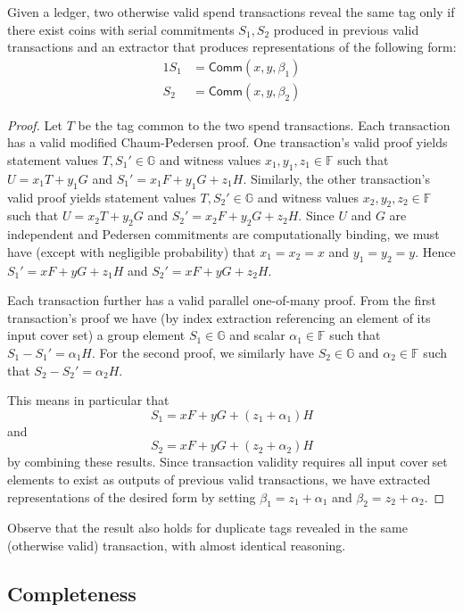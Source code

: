 \documentclass{llncs}
\newcommand{\G}{\mathbb{G}}
\newcommand{\F}{\mathbb{F}}
\newcommand{\func}[1]{\mathsf{#1}}
\newcommand{\comm}{\func{Comm}}
\begin{document}
\begin{lemma}\label{lem:extract}
    Given a ledger, two otherwise valid spend transactions reveal the same tag only if there exist coins with serial commitments $S_1,S_2$ produced in previous valid transactions and an extractor that produces representations of the following form:
    \begin{alignat*}{1}
        S_1 &= \comm(x,y,\beta_1) \\
        S_2 &= \comm(x,y,\beta_2)
    \end{alignat*}
\end{lemma}

\begin{proof}
    Let $T$ be the tag common to the two spend transactions.
    Each transaction has a valid modified Chaum-Pedersen proof.
    One transaction's valid proof yields statement values $T,S_1' \in \G$ and witness values $x_1,y_1,z_1 \in \F$ such that $U = x_1 T + y_1 G$ and $S_1' = x_1 F + y_1 G + z_1 H$.
    Similarly, the other transaction's valid proof yields statement values $T,S_2' \in \G$ and witness values $x_2,y_2,z_2 \in \F$ such that $U = x_2 T + y_2 G$ and $S_2' = x_2 F + y_2 G + z_2 H$.
    Since $U$ and $G$ are independent and Pedersen commitments are computationally binding, we must have (except with negligible probability) that $x_1 = x_2 = x$ and $y_1 = y_2 = y$.
    Hence $S_1' = xF + yG + z_1 H$ and $S_2' = xF + yG + z_2 H$.

    Each transaction further has a valid parallel one-of-many proof.
    From the first transaction's proof we have (by index extraction referencing an element of its input cover set) a group element $S_1 \in \G$ and scalar $\alpha_1 \in \F$ such that $S_1 - S_1' = \alpha_1 H$.
    For the second proof, we similarly have $S_2 \in \G$ and $\alpha_2 \in \F$ such that $S_2 - S_2' = \alpha_2 H$.

    This means in particular that $$S_1 = xF + yG + (z_1 + \alpha_1)H$$ and $$S_2 = xF + yG + (z_2 + \alpha_2)H$$ by combining these results.
    Since transaction validity requires all input cover set elements to exist as outputs of previous valid transactions, we have extracted representations of the desired form by setting $\beta_1 = z_1 + \alpha_1$ and $\beta_2 = z_2 + \alpha_2$.
\end{proof}
Observe that the result also holds for duplicate tags revealed in the same (otherwise valid) transaction, with almost identical reasoning.

\subsection{Completeness}
\end{document}
